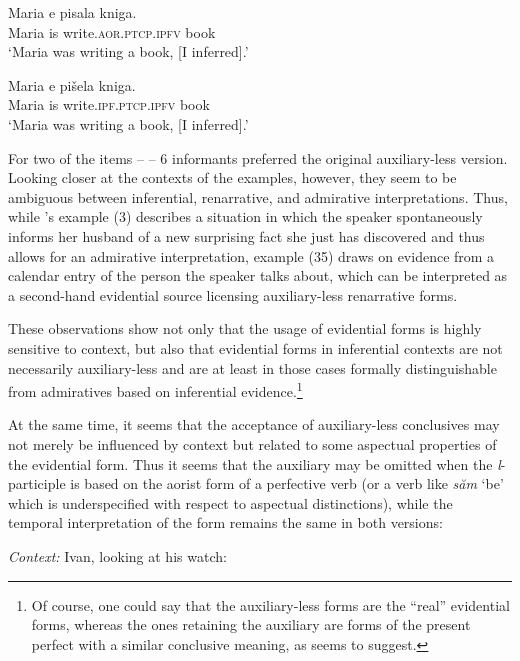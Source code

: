 \documentclass[output=paper,
colorlinks,
citecolor=brown,
newtxmath
]{langscibook}
\begin{document}
\ea \label{smirnova:infer-acceptability:alternative1}
\gll Maria e pisala kniga. \\
Maria is write.\textsc{aor.ptcp.ipfv} book\\
\glt `Maria was writing a book, [I inferred].'
\z

\ea \label{smirnova:infer-acceptability:alternative2}
\gll Maria e pišela kniga. \\
Maria is write.\textsc{ipf.ptcp.ipfv} book\\
\glt ‘Maria was writing a book, [I inferred].’
\z

\noindent For two of the items -- \citet[480, (3) and 498, (35)]{Smirnova2013} -- 6 informants preferred the original auxiliary-less version. Looking closer at the contexts of the examples, however, they seem to be ambiguous between inferential, renarrative, and admirative interpretations. Thus, while \citeauthor{Smirnova2013}'s example (3) describes a situation in which the speaker spontaneously informs her husband of a new surprising fact she just has discovered and thus allows for an admirative interpretation, example (35) draws on evidence from a calendar entry of the person the speaker talks about, which can be interpreted as a second-hand evidential source licensing auxiliary-less renarrative forms.

These observations show not only that the usage of  evidential forms is highly sensitive to context, but also that evidential forms in inferential contexts are not necessarily auxiliary-less and are at least in those cases formally distinguishable from admiratives based on inferential evidence.\footnote{Of course, one could say that the auxiliary-less forms are the ``real'' evidential forms, whereas the ones retaining the auxiliary are forms of the present perfect with a similar conclusive meaning, as \citet{Izvorski1997} seems to suggest.}

At the same time, it seems that the acceptance of auxiliary-less conclusives may not merely be influenced by context but related to some aspectual properties of the evidential form. Thus it seems that the auxiliary may be omitted when the \textit{l}-participle is based on the aorist form of a perfective verb (or a verb like \textit{săm} `be' which is underspecified with respect to aspectual distinctions), while the temporal interpretation of the form remains the same in both versions:

\eanoraggedright\label{stanalo}
\textit{Context:} Ivan, looking at his watch:\vspace{-6pt}
\z
\begin{exe}
\end{exe}
\end{document}

